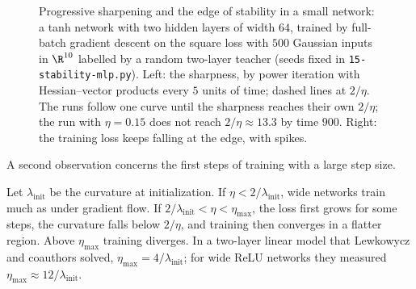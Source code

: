 \begin{refsection}
\begin{figure}[t]
\begin{fullwidth}
\centering
{}
\end{fullwidth}
\caption{Progressive sharpening and the edge of stability in a small network: a tanh network with two hidden layers of width $64$, trained by full-batch gradient descent on the square loss with $500$ Gaussian inputs in $\R^{10}$ labelled by a random two-layer teacher (seeds fixed in \texttt{15-stability-mlp.py}). Left: the sharpness, by power iteration with Hessian--vector products every $5$ units of time; dashed lines at $2/\eta$. The runs follow one curve until the sharpness reaches their own $2/\eta$; the run with $\eta=0.15$ does not reach $2/\eta\approx13.3$ by time $900$. Right: the training loss keeps falling at the edge, with spikes.}
\label{fig:stability:mlp}
\end{figure}

A second observation concerns the first steps of training with a large step size.

\begin{observation}\label{obs:stability:catapult}
Let $\lambda_{\mathrm{init}}$ be the curvature at initialization. If $\eta<2/\lambda_{\mathrm{init}}$, wide networks train much as under gradient flow. If $2/\lambda_{\mathrm{init}}<\eta<\eta_{\max}$, the loss first grows for some steps, the curvature falls below $2/\eta$, and training then converges in a flatter region. Above $\eta_{\max}$ training diverges. In a two-layer linear model that Lewkowycz and coauthors solved, $\eta_{\max}=4/\lambda_{\mathrm{init}}$; for wide ReLU networks they measured $\eta_{\max}\approx12/\lambda_{\mathrm{init}}$.
\end{observation}


\end{refsection}
